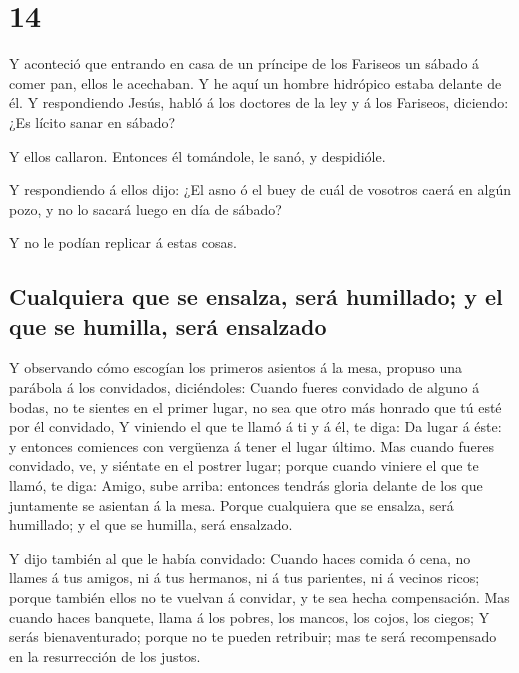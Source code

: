 \hypertarget{section-13}{%
\section{14}\label{section-13}}

 Y aconteció que entrando en casa de un príncipe de los
Fariseos un sábado á comer pan, ellos le acechaban.  Y he
aquí un hombre hidrópico estaba delante de él.  Y
respondiendo Jesús, habló á los doctores de la ley y á los Fariseos,
diciendo: ¿Es lícito sanar en sábado?

 Y ellos callaron. Entonces él tomándole, le sanó, y
despidióle.

 Y respondiendo á ellos dijo: ¿El asno ó el buey de cuál
de vosotros caerá en algún pozo, y no lo sacará luego en día de sábado?

 Y no le podían replicar á estas cosas.

\hypertarget{cualquiera-que-se-ensalza-seruxe1-humillado-y-el-que-se-humilla-seruxe1-ensalzado}{%
\subsection{Cualquiera que se ensalza, será humillado; y el que se
humilla, será
ensalzado}\label{cualquiera-que-se-ensalza-seruxe1-humillado-y-el-que-se-humilla-seruxe1-ensalzado}}

 Y observando cómo escogían los primeros asientos á la
mesa, propuso una parábola á los convidados, diciéndoles: 
Cuando fueres convidado de alguno á bodas, no te sientes en el primer
lugar, no sea que otro más honrado que tú esté por él convidado,
 Y viniendo el que te llamó á ti y á él, te diga: Da lugar
á éste: y entonces comiences con vergüenza á tener el lugar último.
 Mas cuando fueres convidado, ve, y siéntate en el
postrer lugar; porque cuando viniere el que te llamó, te diga: Amigo,
sube arriba: entonces tendrás gloria delante de los que juntamente se
asientan á la mesa.  Porque cualquiera que se ensalza,
será humillado; y el que se humilla, será ensalzado.

 Y dijo también al que le había convidado: Cuando haces
comida ó cena, no llames á tus amigos, ni á tus hermanos, ni á tus
parientes, ni á vecinos ricos; porque también ellos no te vuelvan á
convidar, y te sea hecha compensación.  Mas cuando haces
banquete, llama á los pobres, los mancos, los cojos, los ciegos;
 Y serás bienaventurado; porque no te pueden retribuir;
mas te será recompensado en la resurrección de los justos.

